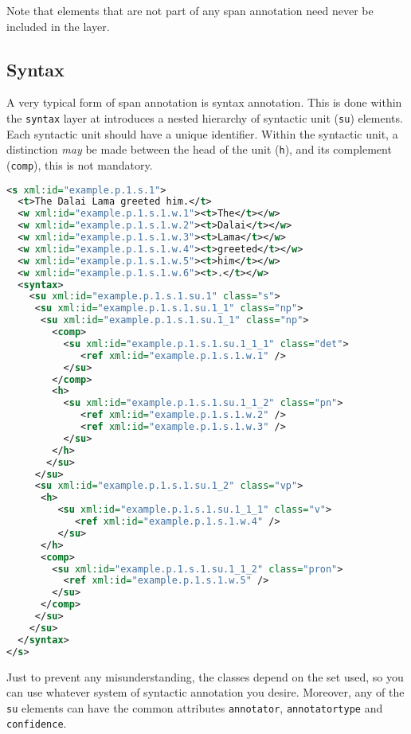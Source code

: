 \documentclass[a4paper,12pt]{report}
\begin{document}
Note that elements that are not part of any span annotation need never be included in the layer.

\subsection{Syntax}

A very typical form of span annotation is syntax annotation. This is done within the \texttt{syntax} layer at introduces a nested hierarchy of syntactic unit (\texttt{su}) elements. Each syntactic unit should have a unique identifier. Within the syntactic unit, a distinction \emph{may} be made between the head of the unit (\texttt{h}), and its complement (\texttt{comp}), this is not mandatory.

\begin{lstlisting}[language=xml]
<s xml:id="example.p.1.s.1">
  <t>The Dalai Lama greeted him.</t>
  <w xml:id="example.p.1.s.1.w.1"><t>The</t></w>
  <w xml:id="example.p.1.s.1.w.2"><t>Dalai</t></w>
  <w xml:id="example.p.1.s.1.w.3"><t>Lama</t></w>
  <w xml:id="example.p.1.s.1.w.4"><t>greeted</t></w>
  <w xml:id="example.p.1.s.1.w.5"><t>him</t></w>
  <w xml:id="example.p.1.s.1.w.6"><t>.</t></w>
  <syntax>
    <su xml:id="example.p.1.s.1.su.1" class="s">     
     <su xml:id="example.p.1.s.1.su.1_1" class="np">    
      <su xml:id="example.p.1.s.1.su.1_1" class="np">
        <comp>
          <su xml:id="example.p.1.s.1.su.1_1_1" class="det">
             <ref xml:id="example.p.1.s.1.w.1" />       
          </su>
        </comp>
        <h>
          <su xml:id="example.p.1.s.1.su.1_1_2" class="pn">
             <ref xml:id="example.p.1.s.1.w.2" />
             <ref xml:id="example.p.1.s.1.w.3" />        
          </su>
        </h>          
       </su>
     </su>
     <su xml:id="example.p.1.s.1.su.1_2" class="vp"> 
      <h>
         <su xml:id="example.p.1.s.1.su.1_1_1" class="v">
            <ref xml:id="example.p.1.s.1.w.4" />       
         </su>
      </h>
      <comp>
        <su xml:id="example.p.1.s.1.su.1_1_2" class="pron">
          <ref xml:id="example.p.1.s.1.w.5" />       
        </su>
      </comp>
     </su>    
    </su>
  </syntax>
</s>
\end{lstlisting}

Just to prevent any misunderstanding, the classes depend on the set used, so you can use whatever system of syntactic annotation you desire. Moreover, any of the \texttt{su} elements can have the common attributes \texttt{annotator}, \texttt{annotatortype} and \texttt{confidence}.
\end{document}
